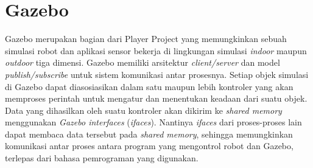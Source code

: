 \section{Gazebo}
\label{sec:gazebo}

Gazebo \citep{cit:koenig2004} merupakan bagian dari Player Project \citep{cit:gerkey2003} yang memungkinkan sebuah simulasi robot dan aplikasi sensor bekerja di lingkungan simulasi \emph{indoor} maupun \emph{outdoor} tiga dimensi.
Gazebo memiliki arsitektur \emph{client/server} dan model \emph{publish/subscribe} untuk sistem komunikasi antar prosesnya.
Setiap objek simulasi di Gazebo dapat diasosiasikan dalam satu maupun lebih kontroler yang akan memproses perintah untuk mengatur dan menentukan keadaan dari suatu objek.
Data yang dihasilkan oleh suatu kontroler akan dikirim ke \emph{shared memory} menggunakan \emph{Gazebo interfaces} (\emph{ifaces}).
Nantinya \emph{ifaces} dari proses-proses lain dapat membaca data tersebut pada \emph{shared memory}, sehingga memungkinkan komunikasi antar proses antara program yang mengontrol robot dan Gazebo, terlepas dari bahasa pemrograman yang digunakan.
